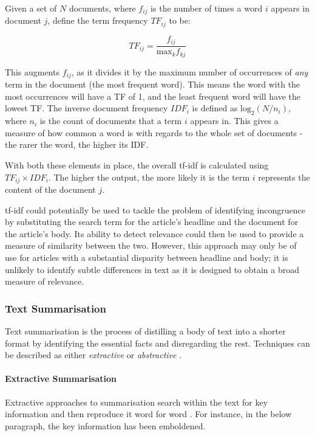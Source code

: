 Given a set of \(N\) documents, where \(f_{ij}\) is the number of times a word \(i\) appears in document \(j\), \citeauthor{Rajaraman2011} define the term frequency \(TF_{ij}\) to be:

\[TF_{ij} = \frac{f_{ij}}{\textrm{max}_k f_{kj}}\]

This augments \(f_{ij}\), as it divides it by the maximum number of occurrences of \textit{any} term in the document (the most frequent word). This means the word with the most occurrences will have a TF of 1, and the least frequent word will have the lowest TF. The inverse document frequency \(IDF_i\) is defined as \(\textrm{log}_2(N/n_i)\), where \(n_i\) is the count of documents that a term \(i\) appears in. This gives a measure of how common a word is with regards to the whole set of documents - the rarer the word, the higher its IDF.

With both these elements in place, the overall tf-idf is calculated using \(TF_{ij} \times IDF_i\). The higher the output, the more likely it is the term \(i\) represents the content of the document \(j\).

tf-idf could potentially be used to tackle the problem of identifying incongruence by substituting the search term for the article's headline and the document for the article's body. Its ability to detect relevance could then be used to provide a measure of similarity between the two. However, this approach may only be of use for articles with a substantial disparity between headline and body; it is unlikely to identify subtle differences in text as it is designed to obtain a broad measure of relevance.


\subsubsection{Text Summarisation}

Text summarisation is the process of distilling a body of text into a shorter format by identifying the essential facts and disregarding the rest. Techniques can be described as either \textit{extractive} or \textit{abstractive}  \cite{maybury1999} \cite{tan2017}.

\paragraph{Extractive Summarisation}
Extractive approaches to summarisation search within the text for key information and then reproduce it word for word \cite{tan2017}. For instance, in the below paragraph, the key information has been emboldened.


